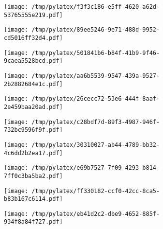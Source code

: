 \documentclass{article}
\begin{document}
\begin{figure}[htbp]
\begin{subfigure}[b]{.3\linewidth}
\texttt{[image: /tmp/pylatex/f3f3c186-e5ff-4620-a62d-53765555e219.pdf]}
\end{subfigure}
\begin{subfigure}[b]{.3\linewidth}
\texttt{[image: /tmp/pylatex/89ee5246-9e71-488d-9952-cd5016ff32d4.pdf]}
\end{subfigure}
\begin{subfigure}[b]{.3\linewidth}
\texttt{[image: /tmp/pylatex/501841b6-b84f-41b9-9f46-9caea5528bcd.pdf]}
\end{subfigure}
\begin{subfigure}[b]{.3\linewidth}
\texttt{[image: /tmp/pylatex/aa6b5539-9547-439a-9527-2b2882684e1c.pdf]}
\end{subfigure}
\begin{subfigure}[b]{.3\linewidth}
\texttt{[image: /tmp/pylatex/26cecc72-53e6-444f-8aaf-2e459baa20ad.pdf]}
\end{subfigure}
\begin{subfigure}[b]{.3\linewidth}
\texttt{[image: /tmp/pylatex/c28bdf7d-89f3-4987-946f-732bc9596f9f.pdf]}
\end{subfigure}
\begin{subfigure}[b]{.3\linewidth}
\texttt{[image: /tmp/pylatex/30310027-ab44-4789-bb32-4c6dd2b2ea17.pdf]}
\end{subfigure}
\begin{subfigure}[b]{.3\linewidth}
\texttt{[image: /tmp/pylatex/e69b7527-7f09-4293-b814-7ff0c3ba5ba2.pdf]}
\end{subfigure}
\begin{subfigure}[b]{.3\linewidth}
\texttt{[image: /tmp/pylatex/ff330182-ccf0-42cc-8ca5-b83b167c6114.pdf]}
\end{subfigure}
\begin{subfigure}[b]{.3\linewidth}
\texttt{[image: /tmp/pylatex/eb41d2c2-dbe9-4652-885f-934f8a84f727.pdf]}
\end{subfigure}
\end{figure}
\end{document}
